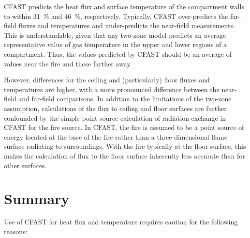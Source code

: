 CFAST predicts the heat flux and surface temperature of the compartment walls to within 31~\% and 46~\%, respectively.  Typically, CFAST over-predicts the far-field fluxes and temperatures and under-predicts the near-field measurements.  This is understandable, given that any two-zone model predicts an average representative value of gas temperature in the upper and lower regions of a compartment.  Thus, the values predicted by CFAST should be an average of values near the fire and those farther away.

However, differences for the ceiling and (particularly) floor fluxes and temperatures are higher, with a more pronounced difference between the near-field and far-field comparisons.  In addition to the limitations of the two-zone assumption, calculations of the flux to ceiling and floor surfaces are further confounded by the simple point-source calculation of radiation exchange in CFAST for the fire source.  In CFAST, the fire is assumed to be a point source of energy located at the base of the fire rather than a three-dimensional flame surface radiating to surroundings.  With the fire typically at the floor surface, this makes the calculation of flux to the floor surface inherently less accurate than for other surfaces.

\section{Summary}

Use of CFAST for heat flux and temperature requires caution for the following reasons:

